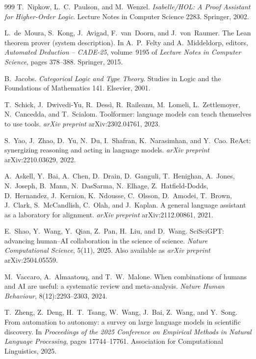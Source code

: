 \begin{thebibliography}{999}
T.~Nipkow, L.~C.~Paulson, and M.~Wenzel.
\newblock \emph{Isabelle/HOL: A Proof Assistant for Higher-Order Logic}.
\newblock Lecture Notes in Computer Science 2283. Springer, 2002.

L.~de~Moura, S.~Kong, J.~Avigad, F.~van~Doorn, and J.~von~Raumer.
\newblock The {L}ean theorem prover (system description).
\newblock In A.~P.~Felty and A.~Middeldorp, editors, \emph{Automated Deduction -- CADE-25}, volume~9195 of \emph{Lecture Notes in Computer Science}, pages 378--388. Springer, 2015.

B.~Jacobs.
\newblock \emph{Categorical Logic and Type Theory}.
\newblock Studies in Logic and the Foundations of Mathematics 141. Elsevier, 2001.

T.~Schick, J.~Dwivedi-Yu, R.~Dess\`i, R.~Raileanu, M.~Lomeli, L.~Zettlemoyer, N.~Cancedda, and T.~Scialom.
\newblock Toolformer: language models can teach themselves to use tools.
\newblock \emph{arXiv preprint} arXiv:2302.04761, 2023.

S.~Yao, J.~Zhao, D.~Yu, N.~Du, I.~Shafran, K.~Narasimhan, and Y.~Cao.
\newblock ReAct: synergizing reasoning and acting in language models.
\newblock \emph{arXiv preprint} arXiv:2210.03629, 2022.

A.~Askell, Y.~Bai, A.~Chen, D.~Drain, D.~Ganguli, T.~Henighan, A.~Jones, N.~Joseph, B.~Mann, N.~DasSarma, N.~Elhage, Z.~Hatfield-Dodds, D.~Hernandez, J.~Kernion, K.~Ndousse, C.~Olsson, D.~Amodei, T.~Brown, J.~Clark, S.~McCandlish, C.~Olah, and J.~Kaplan.
\newblock A general language assistant as a laboratory for alignment.
\newblock \emph{arXiv preprint} arXiv:2112.00861, 2021.

E.~Shao, Y.~Wang, Y.~Qian, Z.~Pan, H.~Liu, and D.~Wang.
\newblock SciSciGPT: advancing human--AI collaboration in the science of science.
\newblock \emph{Nature Computational Science}, 5(11), 2025. Also available as \emph{arXiv preprint} arXiv:2504.05559.

M.~Vaccaro, A.~Almaatouq, and T.~W.~Malone.
\newblock When combinations of humans and AI are useful: a systematic review and meta-analysis.
\newblock \emph{Nature Human Behaviour}, 8(12):2293--2303, 2024.

T.~Zheng, Z.~Deng, H.~T.~Tsang, W.~Wang, J.~Bai, Z.~Wang, and Y.~Song.
\newblock From automation to autonomy: a survey on large language models in scientific discovery.
\newblock In \emph{Proceedings of the 2025 Conference on Empirical Methods in Natural Language Processing}, pages 17744--17761. Association for Computational Linguistics, 2025.


\end{thebibliography}
